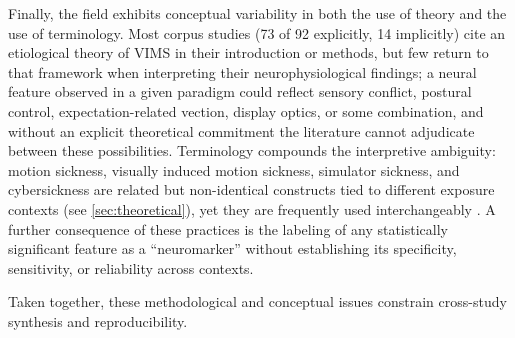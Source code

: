 Finally, the field exhibits conceptual variability in both the use of theory and the use of terminology.
Most corpus studies (73 of 92 explicitly, 14 implicitly) cite an etiological theory of VIMS in their introduction or methods, but few return to that framework when interpreting their neurophysiological findings; a neural feature observed in a given paradigm could reflect sensory conflict, postural control, expectation-related vection, display optics, or some combination, and without an explicit theoretical commitment the literature cannot adjudicate between these possibilities.
Terminology compounds the interpretive ambiguity: motion sickness, visually induced motion sickness, simulator sickness, and cybersickness are related but non-identical constructs tied to different exposure contexts (see \autoref{sec:theoretical}), yet they are frequently used interchangeably \cite{kennedyResearchVisuallyInduced2010, chaMotionSicknessDiagnostic2021, stanneyCybersicknessNotSimulator1997, rebenitschReviewCybersicknessApplications2016}.
A further consequence of these practices is the labeling of any statistically significant feature as a ``neuromarker'' without establishing its specificity, sensitivity, or reliability across contexts.

Taken together, these methodological and conceptual issues constrain cross-study synthesis and reproducibility.
